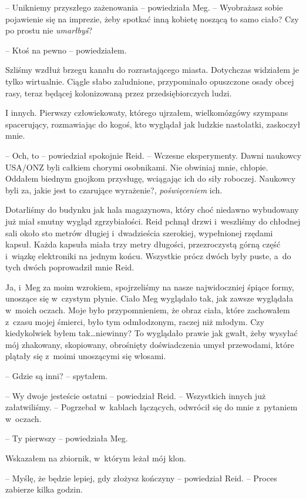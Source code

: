 \documentclass[oneside,polish,11pt,sfheadings]{mwbk}
\begin{document}
-- Unikniemy przyszłego zażenowania -- powiedziała Meg. -- Wyobrażasz sobie
pojawienie się na imprezie, żeby spotkać inną kobietę noszącą to samo
ciało? Czy po prostu nie \emph{umarłbyś}?

-- Ktoś na pewno -- powiedziałem.

Szliśmy wzdłuż brzegu kanału do rozrastającego miasta. Dotychczas
widziałem je tylko wirtualnie. Ciągle słabo zaludnione, przypominało
opuszczone osady obcej rasy, teraz będącej kolonizowaną przez
przedsiębiorczych ludzi.

I innych. Pierwszy człowiekowaty, którego ujrzałem, wielkomózgówy
szympans spacerujący, rozmawiając do kogoś, kto wyglądał jak ludzkie
nastolatki, zaskoczył mnie.

-- Och, to -- powiedział spokojnie Reid. -- Wczesne eksperymenty. Dawni
naukowcy USA/ONZ byli całkiem chorymi osobnikami. Nie obwiniaj mnie,
chłopie. Oddałem biednym gnojkom przysługę, wciągając ich do siły
roboczej. Naukowcy byli za, jakie jest to czarujące wyrażenie?,
\emph{poświęceniem} ich.

Dotarliśmy do budynku jak hala magazynowa, który choć niedawno
wybudowany już miał smutny wygląd zgrzybiałości. Reid pchnął drzwi i~weszliśmy do chłodnej sali około sto metrów długiej i~dwadzieścia
szerokiej, wypełnionej rzędami kapsuł. Każda kapsuła miała trzy metry
długości, przezroczystą górną część i~wiązkę elektroniki na jednym
końcu. Wszystkie prócz dwóch były puste, a~do tych dwóch poprowadził
mnie Reid.

Ja, i~Meg za moim wzrokiem, spojrzeliśmy na nasze najwidoczniej śpiące
formy, unoszące się w~czystym płynie. Ciało Meg wyglądało tak, jak
zawsze wyglądała w~moich oczach. Moje było przypomnieniem, że obraz
ciała, które zachowałem z~czasu mojej śmierci, było tym odmłodzonym,
raczej niż młodym. Czy kiedykolwiek byłem tak\ldots niewinny? To wyglądało
prawie jak gwałt, żeby wysyłać mój zhakowany, skopiowany, obrośnięty
doświadczenia umysł przewodami, które plątały się z~moimi unoszącymi się
włosami.

-- Gdzie są inni? -- spytałem.

-- Wy dwoje jesteście ostatni -- powiedział Reid. -- Wszystkich innych już
załatwiliśmy. -- Pogrzebał w~kablach łączących, odwrócił się do mnie z~pytaniem w~oczach.

-- Ty pierwszy -- powiedziała Meg.

Wskazałem na zbiornik, w~którym leżał mój klon.

-- Myślę, że będzie lepiej, gdy złożysz kończyny -- powiedział Reid. -- Proces zabierze kilka godzin.
\end{document}

